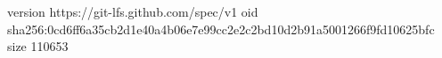 version https://git-lfs.github.com/spec/v1
oid sha256:0cd6ff6a35cb2d1e40a4b06e7e99cc2e2c2bd10d2b91a5001266f9fd10625bfc
size 110653
